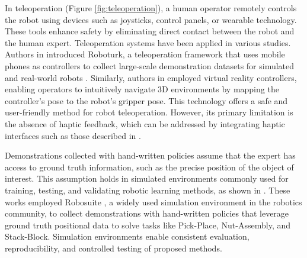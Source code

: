 In teleoperation (Figure \ref{fig:teleoperation}), a human operator remotely controls the robot using devices such as joysticks, control panels, or wearable technology. These tools enhance safety by eliminating direct contact between the robot and the human expert. Teleoperation systems have been applied in various studies. Authors in \cite{mandlekar2018roboturk,mandlekar2019scaling} introduced Roboturk, a teleoperation framework that uses mobile phones as controllers to collect large-scale demonstration datasets for simulated and real-world robots \cite{mandlekar2019scaling,mandlekar2022matters}. Similarly, authors in \cite{zhang2018deep_vr_teleoperation,jang2022bc_z,brohan2022rt} employed virtual reality controllers, enabling operators to intuitively navigate 3D environments by mapping the controller's pose to the robot's gripper pose. This technology offers a safe and user-friendly method for robot teleoperation. However, its primary limitation is the absence of haptic feedback, which can be addressed by integrating haptic interfaces such as those described in \cite{cyberglove,touch}.

Demonstrations collected with hand-written policies assume that the expert has access to ground truth information, such as the precise position of the object of interest. This assumption holds in simulated environments commonly used for training, testing, and validating robotic learning methods, as shown in \cite{dasari2021transformers_one_shot,mandi2022towards_more_generalizable_one_shot,chang2023one}. These works employed Robosuite \cite{zhu2020robosuite}, a widely used simulation environment in the robotics community, to collect demonstrations with hand-written policies that leverage ground truth positional data to solve tasks like Pick-Place, Nut-Assembly, and Stack-Block. Simulation environments enable consistent evaluation, reproducibility, and controlled testing of proposed methods. 

